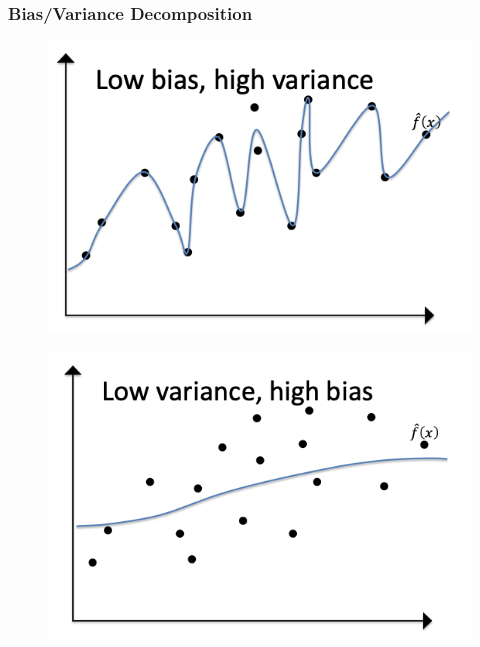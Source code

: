 \documentclass[
  shownotes,
  xcolor={svgnames},
  hyperref={colorlinks,citecolor=DarkBlue,linkcolor=andesred,urlcolor=DarkBlue}
  , aspectratio=169]{beamer}
\begin{document}
\begin{frame}
\frametitle{Bias/Variance Decomposition}



\begin{minipage}[t]{0.45\linewidth}
        \begin{figure}[H] \centering
            \captionsetup{justification=centering}  
            \includegraphics[scale=0.65]{figures/low_bias_high_variance.png}
            
    \end{figure}
    \end{minipage}
    \hfill
    \begin{minipage}[t]{0.45\linewidth}%
        \begin{figure}[H] \centering
            \captionsetup{justification=centering}  
            \includegraphics[scale=0.65]{figures/high_bias_low_variance.png}
            
    \end{figure}
    \end{minipage}


\end{frame}
\end{document}
